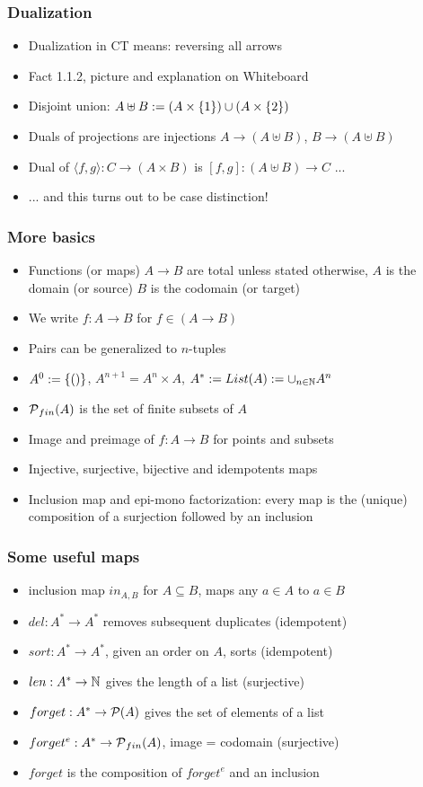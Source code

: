 \documentclass[handout]{beamer}
\begin{document}
\frame
  {   
    \frametitle{Dualization}\label{Ch1:sets}

 \begin{itemize}[<+->]
\item Dualization in CT means: reversing all arrows
\item Fact 1.1.2, picture and explanation on Whiteboard
\item Disjoint union: $A\uplus B := (A\times\{1\})\cup(A\times\{2\})$
\item Duals of projections are injections $A \to (A\uplus B)$, $B \to (A\uplus B)$
\item Dual of $\langle f,g\rangle : C \to (A\times B)$ is $[ f,g] : (A\uplus B) \to C$ ...
\item ... and this turns out to be case distinction!
 \end{itemize}

 }


\frame
  {   
     \frametitle{More basics}\label{Ch1:setbasics}

 \begin{itemize}[<+->]
\item Functions (or maps) $A\to B$ are total unless stated otherwise, 
$A$ is the domain (or source) $B$ is the codomain (or target)
\item We write $f: A\to B$ for $f\in (A\to B)$
\item Pairs can be generalized to $n$-tuples
\item $A^0 := \{()\}$, $A^{n+1}=A^n\times A$,
$A^* := List(A) := \cup_{n\in\mathbb{N}} A^n$
\item $\operatorname{\mathcal{P}}_{fin}(A)$ is the set of finite subsets of $A$
\item Image and preimage of $f: A\to B$ for points and subsets 
\item Injective, surjective, bijective and idempotents maps
\item Inclusion map and epi-mono factorization: every map
is the (unique) composition of a surjection followed by an inclusion
 \end{itemize}

 }

\frame
  {   
    \frametitle{Some useful maps}\label{Ch1:usefulmaps}

 \begin{itemize}[<+->]
\item inclusion map $in_{A,B}$ for $A\subseteq B$, maps any $a\in A$ to $a\in B$
\item $del: A^* \to A^* $ removes subsequent duplicates (idempotent)
\item $sort: A^* \to A^* $, given an order on $A$, sorts (idempotent)
\item $len: A^* \to \mathbb{N} $ gives the length of a list (surjective)
\item $forget: A^* \to \operatorname{\mathcal{P}}(A) $ gives the set of  elements of a list
\item $forget^e: A^* \to \operatorname{\mathcal{P}}_{fin}(A)$, image = codomain (surjective)
\item $forget$ is the composition of $forget^e$ and an inclusion
 \end{itemize}

 }
\end{document}
